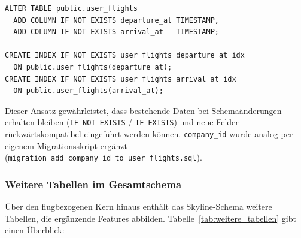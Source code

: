 \begin{lstlisting}[style=skyline-sql,
  caption={Migration: Zeitfelder in \texttt{user\_flights}
           (migration\_add\_flight\_times.sql)},
  label={lst:migration_flight_times}]
ALTER TABLE public.user_flights
  ADD COLUMN IF NOT EXISTS departure_at TIMESTAMP,
  ADD COLUMN IF NOT EXISTS arrival_at   TIMESTAMP;

CREATE INDEX IF NOT EXISTS user_flights_departure_at_idx
  ON public.user_flights(departure_at);
CREATE INDEX IF NOT EXISTS user_flights_arrival_at_idx
  ON public.user_flights(arrival_at);
\end{lstlisting}

Dieser Ansatz gewährleistet, dass bestehende Daten bei Schemaänderungen
erhalten bleiben (\texttt{IF NOT EXISTS} / \texttt{IF EXISTS}) und
neue Felder rückwärtskompatibel eingeführt werden können.
\texttt{company\_id} wurde analog per eigenem Migrationsskript ergänzt
(\texttt{migration\_add\_company\_id\_to\_\allowbreak user\_flights.sql}).

\subsubsection*{Weitere Tabellen im Gesamtschema}

Über den flugbezogenen Kern hinaus enthält das Skyline-Schema weitere Tabellen,
die ergänzende Features abbilden.
Tabelle~\ref{tab:weitere_tabellen} gibt einen Überblick:

